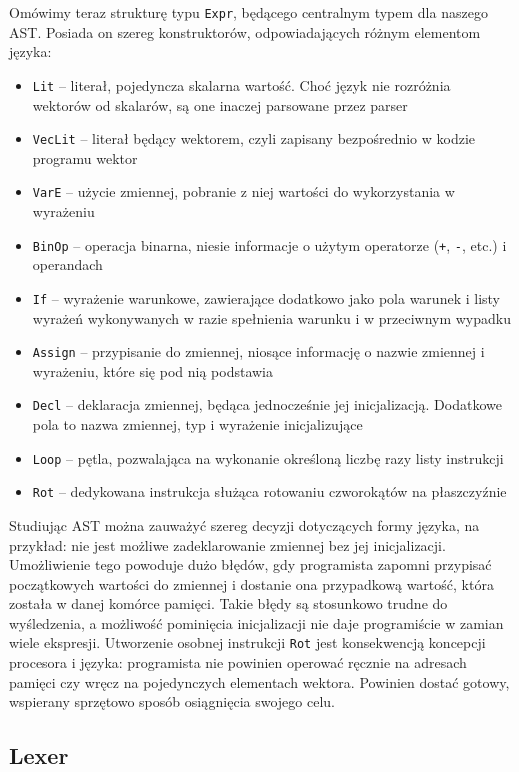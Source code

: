 Omówimy teraz strukturę typu \texttt{Expr}, będącego centralnym typem dla naszego AST. Posiada on szereg konstruktorów, odpowiadających różnym elementom języka:
\begin{itemize}
  \item \texttt{Lit} -- literał, pojedyncza skalarna wartość. Choć język nie rozróżnia wektorów od skalarów, są one inaczej parsowane przez parser
  \item \texttt{VecLit} -- literał będący wektorem, czyli zapisany bezpośrednio w kodzie programu wektor
  \item \texttt{VarE} -- użycie zmiennej, pobranie z niej wartości do wykorzystania w wyrażeniu
  \item \texttt{BinOp} -- operacja binarna, niesie informacje o użytym operatorze (\texttt{+}, \texttt{-}, etc.) i operandach
  \item \texttt{If} -- wyrażenie warunkowe, zawierające dodatkowo jako pola warunek i listy wyrażeń wykonywanych w razie spełnienia warunku i w przeciwnym wypadku
  \item \texttt{Assign} -- przypisanie do zmiennej, niosące informację o nazwie zmiennej i wyrażeniu, które się pod nią podstawia
  \item \texttt{Decl} -- deklaracja zmiennej, będąca jednocześnie jej inicjalizacją. Dodatkowe pola to nazwa zmiennej, typ i wyrażenie inicjalizujące
  \item \texttt{Loop} -- pętla, pozwalająca na wykonanie określoną liczbę razy listy instrukcji
  \item \texttt{Rot} -- dedykowana instrukcja służąca rotowaniu czworokątów na płaszczyźnie
\end{itemize}

Studiując AST można zauważyć szereg decyzji dotyczących formy języka, na przykład: nie jest możliwe zadeklarowanie zmiennej bez jej inicjalizacji. Umożliwienie tego powoduje dużo błędów, gdy programista zapomni przypisać początkowych wartości do zmiennej i dostanie ona przypadkową wartość, która została w danej komórce pamięci. Takie błędy są stosunkowo trudne do wyśledzenia, a możliwość pominięcia inicjalizacji nie daje programiście w zamian wiele ekspresji. Utworzenie osobnej instrukcji \texttt{Rot} jest konsekwencją koncepcji procesora i języka: programista nie powinien operować ręcznie na adresach pamięci czy wręcz na pojedynczych elementach wektora. Powinien dostać gotowy, wspierany sprzętowo sposób osiągnięcia swojego celu.

\subsection{Lexer}

